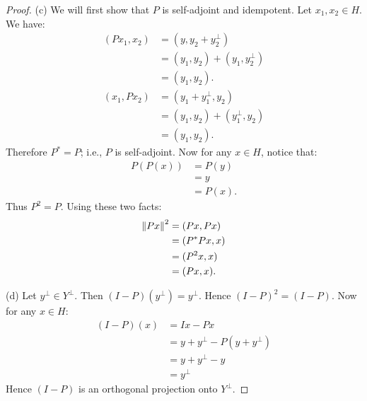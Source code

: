 \documentclass[10pt,oneside,openany]{memoir}
\begin{document}
\begin{proof}
        (c) We will first show that $P$ is self-adjoint and idempotent. Let $x_1,x_2 \in H$. We have:
            \begin{equation*}
            \begin{split}
                (Px_1,x_2)
                & = (y,y_2 + y_2^\perp) \\
                & = (y_1,y_2) + (y_1,y_2^\perp) \\
                & = (y_1,y_2). 
            \end{split}
            \end{equation*}
            \begin{equation*}
            \begin{split}
                (x_1,Px_2)
                & = (y_1 + y_1^\perp , y_2) \\
                & = (y_1,y_2) + (y_1^\perp, y_2) \\
                & = (y_1,y_2).
            \end{split}
            \end{equation*}
        Therefore $P^\ast = P$; i.e., $P$ is self-adjoint. Now for any $x \in H$, notice that:
            \begin{equation*}
            \begin{split}
                P(P(x))
                & = P(y) \\
                & = y \\
                & = P(x).
            \end{split}
            \end{equation*}
        Thus $P^2 = P$. Using these two facts:
            \begin{equation*}
            \begin{split}
                \left\lVert Px \right\rVert^2 
                & = (Px,Px) \\
                & = (P^\ast P x, x) \\
                & = (P^2x,x) \\
                & = (Px,x). \qedhere
            \end{split}
            \end{equation*}

        (d) Let $y^\perp \in Y^\perp$. Then $(I - P)(y^\perp) = y^\perp$. Hence $(I-P)^2 = (I-P)$. Now for any $x \in H$: 
            \begin{equation*}
            \begin{split}
                (I - P)(x) 
                & = Ix - Px \\
                & = y+y^\perp - P(y + y^\perp) \\
                & = y+y^\perp - y \\
                & = y^\perp
            \end{split}
            \end{equation*}
        Hence $(I-P)$ is an orthogonal projection onto $Y^\perp$.
\end{proof}
\end{document}
